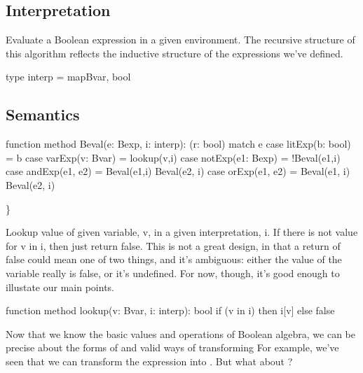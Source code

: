\documentclass[letterpaper,10pt,english]{sphinxmanual}
\begin{document}
\subsection{Interpretation}
\label{\detokenize{09-propositional-logic:interpretation}}
Evaluate a Boolean expression in a given environment.  The recursive
structure of this algorithm reflects the inductive structure of the
expressions we’ve defined.

\begin{sphinxVerbatim}[commandchars=\\\{\}]
type interp = map\PYGZlt{}Bvar, bool\PYGZgt{}
\end{sphinxVerbatim}


\subsection{Semantics}
\label{\detokenize{09-propositional-logic:semantics}}
\begin{sphinxVerbatim}[commandchars=\\\{\}]
function method Beval(e: Bexp, i: interp): (r: bool)
\PYGZob{}
    match e
    \PYGZob{}
        case litExp(b: bool) =\PYGZgt{} b
        case varExp(v: Bvar) =\PYGZgt{} lookup(v,i)
        case notExp(e1: Bexp) =\PYGZgt{} !Beval(e1,i)
        case andExp(e1, e2) =\PYGZgt{} Beval(e1,i) \PYGZam{}\PYGZam{} Beval(e2, i)
        case orExp(e1, e2) =\PYGZgt{}  Beval(e1, i) \textbar{}\textbar{} Beval(e2, i)
    \PYGZcb{}
\PYGZcb{}
\end{sphinxVerbatim}

\}

Lookup value of given variable, v, in a given interpretation, i. If
there is not value for v in i, then just return false. This is not a
great design, in that a return of false could mean one of two things,
and it’s ambiguous: either the value of the variable really is false,
or it’s undefined.  For now, though, it’s good enough to illustate our
main points.

\begin{sphinxVerbatim}[commandchars=\\\{\}]
function method lookup(v: Bvar, i: interp): bool
\PYGZob{}
    if (v in i) then i[v]
    else false
\PYGZcb{}
\end{sphinxVerbatim}

Now that we know the basic values and operations of Boolean algebra,
we can be precise about the forms of and valid ways of transforming
 For example, we’ve seen that we can transform
the expression  into . But what about ?
\end{document}
